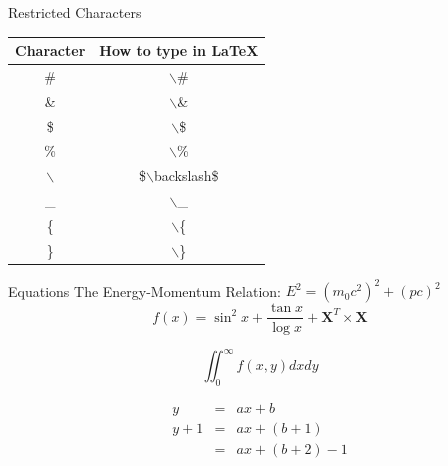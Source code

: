 \documentclass[10pt,times]{beamer}
\begin{document}
\begin{frame}{Restricted Characters}
\begin{table}
\begin{tabular}{cc}
\hline
\textbf{Character} & \textbf{How to type in LaTeX} \\  \hline
\# & $\backslash$\# \\ 
\& & $\backslash$\& \\ 
\$ & $\backslash$\$ \\
\% & $\backslash$\% \\ 
$\backslash$ & \$$\backslash$backslash\$ \\ 
\_ & $\backslash$\_ \\
\{ & $\backslash$\{ \\
\} & $\backslash$\} \\

\end{tabular}
\end{table}
\end{frame}




\begin{frame}{Equations}
The Energy-Momentum Relation: $E^2 = (m_0c^2)^2 + (pc)^2$ \\
\begin{equation}
 f(x)= \sin^2x+\frac{\tan \mathit{x}}{\log \mathit{x}} + \mathbf{X}^T\times\mathbf{X}
\end{equation}

\begin{equation*}
\iint_{0}^{\infty}   f(x,y)dx dy
\end{equation*}

\begin{eqnarray}
	y   & = & ax+b \nonumber\\
	y+1 & = & ax+(b+1)\\
	    & = & ax+(b+2)-1
\end{eqnarray}

\end{frame}
\end{document}
